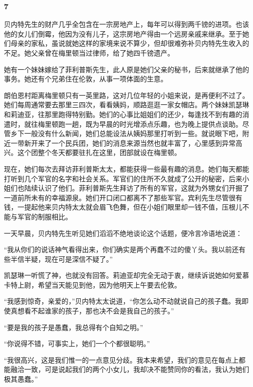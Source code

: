 \subsubsection*{7}

\par 贝内特先生的财产几乎全包含在一宗房地产上，每年可以得到两千镑的进项。也该他的女儿们倒霉，他因为没有儿子，这宗房地产得由一个远房亲戚来继承。至于她们母亲的家私，虽说就她这样的家境来说不算少，但却很难弥补贝内特先生收入的不足。她父亲曾在梅里顿当过律师，给了她四千镑遗产。
\par 她有一个妹妹嫁给了菲利普斯先生，此人原是她们父亲的秘书，后来就继承了他的事务。她还有个兄弟住在伦敦，从事一项体面的生意。
\par 朗伯恩村距离梅里顿只有一英里路，这对几位年轻的小姐来说，是再便利不过了。她们每周通常要去那里三四次，看看姨妈，顺路逛逛一家女帽店。两个妹妹凯瑟琳和莉迪亚，往那里跑得特别勤。她们的心事比姐姐们的还少，每逢找不到有趣的消遣时，就往梅里顿跑一趟，既为早晨的时光增添点乐趣，也为晚上提供点谈助。尽管乡下一般没有什么新闻，她们总能设法从姨妈那里打听到一些。就说眼下吧，附近一带新开来了一个民兵团，她们的消息来源当然也就丰富了，心里感到异常高兴。这个团整个冬天都要驻扎在这里，团部就设在梅里顿。
\par 现在，她们每次去拜访菲利普斯太太，都能获得一些最有趣的消息。她们每天都能打听到几个军官的名字和社会关系。军官们的住所不久就成了公开的秘密，后来小姐们也陆续认识了他们。菲利普斯先生拜访了所有的军官，这就为外甥女们开掘了一道前所未有的幸福源泉。她们开口闭口都离不了那些军官。宾利先生尽管很有钱，一提起他来贝内特太太就会眉飞色舞，但在小姐们眼里却一钱不值，压根儿不能与军官的制服相比。
\par 一天早晨，贝内特先生听见她们滔滔不绝地谈论这个话题，便冷言冷语地说道：
\par “我从你们的说话神气看得出来，你们确实是两个再蠢不过的傻丫头。我以前还有些半信半疑，现在可是深信不疑了。”
\par 凯瑟琳一听慌了神，也就没有回答。莉迪亚却完全无动于衷，继续诉说她如何爱慕卡特上尉，希望当天能见到他，因为他明天上午要去伦敦。
\par “我感到惊奇，亲爱的，”贝内特太太说道，“你怎么动不动就说自己的孩子蠢。我即使真想看不起谁家的孩子，那也决不会是我自己的孩子。”
\par “要是我的孩子是愚蠢，我总得有个自知之明。”
\par “你说得不错，可事实上，她们一个个都很聪明。”
\par “我很高兴，这是我们惟一的一点意见分歧。我本来希望，我们的意见在每点上都能融洽一致，可是说起我们的两个小女儿，我却决不能赞同你的看法，我认为她们极其愚蠢。”
